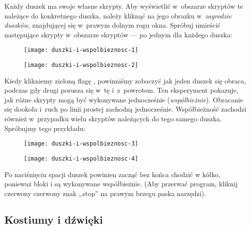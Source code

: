\documentclass{report}
\begin{document}
Każdy duszek ma swoje własne skrypty. Aby wyświetlić w~obszarze skryptów te należące do konkretnego duszka, należy kliknąć na jego obrazku w~\emph{zagrodzie duszków}, znajdującej się w~prawym dolnym rogu okna. Spróbuj umieścić następujące skrypty w~obszarze skryptów --- po jednym dla każdego duszka:

\begin{figure}[H]
\begin{minipage}{0.5\textwidth}
\centering
\texttt{[image: duszki-i-wspolbieznosc-1]}
\end{minipage}%
\begin{minipage}{0.5\textwidth}
\centering
\texttt{[image: duszki-i-wspolbieznosc-2]}
\end{minipage}
\end{figure}

Kiedy klikniemy zieloną flagę , powinniśmy zobaczyć jak jeden duszek się obraca, podczas gdy drugi porusza się w~tę i~z~powrotem. Ten eksperyment pokazuje, jak różne skrypty mogą być wykonywane jednocześnie (\emph{współbieżnie}). Obracanie się dookoła i~ruch po linii prostej zachodzą jednocześnie. Współbieżność zachodzi również w~przypadku wielu skryptów należących do tego samego duszka. Spróbujmy tego przykładu:

\begin{figure}[H]
\begin{minipage}{0.5\textwidth}
\centering
\texttt{[image: duszki-i-wspolbieznosc-3]}
\end{minipage}%
\begin{minipage}{0.5\textwidth}
\centering
\texttt{[image: duszki-i-wspolbieznosc-4]}
\end{minipage}
\end{figure}

Po naciśnięciu spacji duszek powinien zacząć bez końca chodzić w kółko, ponieważ bloki  i  są wykonywane współbieżnie. (Aby przerwać program, kliknij czerwony czerwony znak ,,stop''  na prawym brzegu paska narzędzi).

\subsection{Kostiumy i dźwięki}
\end{document}

